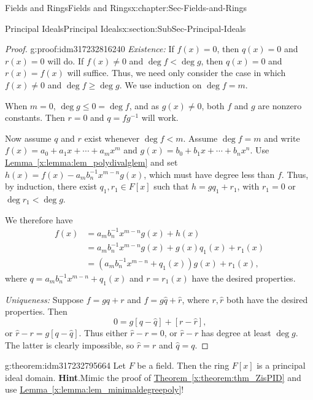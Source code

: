 \documentclass[oneside,10pt,]{book}
\newcommand{\blocktitlefont}{\relax}
\newcommand{\xreffont}{\relax}
\numberwithin{equation}{section}
\renewcommand{\le}{\leqslant}
\renewcommand{\ge}{\geqslant}
\newcommand{\lt}{<}
\newcommand{\amp}{&}
\begin{document}
\begin{chapterptx}{Fields and Rings}{}{Fields and Rings}{}{}{x:chapter:Sec-Fields-and-Rings}
\begin{sectionptx}{Principal Ideals}{}{Principal Ideals}{}{}{x:section:SubSec-Principal-Ideals}
\begin{proof}{}{g:proof:idm317232816240}
\emph{Existence:} If \(f(x) = 0\), then \(q(x) = 0\) and \(r(x) = 0\) will do. If \(f(x)\ne 0\) and \(\deg f \lt \deg g\), then \(q(x) = 0\) and \(r(x) = f(x)\) will suffice. Thus, we need only consider the case in which \(f(x) \ne 0\) and \(\deg f \ge \deg g\). We use induction on \(\deg f = m\).%
\par
When \(m = 0\), \(\deg g \le 0 = \deg f\), and as \(g(x) \ne 0\), both \(f\) and \(g\) are nonzero constants. Then \(r = 0\) and \(q = fg^{-1}\) will work.%
\par
Now assume \(q\) and \(r\) exist whenever \(\deg f \lt m\). Assume \(\deg f = m\) and write \(f(x) = a_0 + a_1 x + \cdots + a_m x^m\) and \(g(x) = b_0 + b_1 x + \cdots + b_n x^n\). Use \hyperref[x:lemma:lem_polydivalglem]{Lemma~{\xreffont\ref{x:lemma:lem_polydivalglem}}} and set \(h(x) = f(x) - a_m b_n^{-1} x^{m-n} g(x)\), which must have degree less than \(f\). Thus, by induction, there exist \(q_1, r_1\in F[x]\) such that \(h = g q_1 + r_1\), with \(r_1 = 0\) or \(\deg r_1 \lt \deg g\).%
\par
We therefore have%
\begin{align*}
f(x) \amp = a_m b_n^{-1} x^{m-n} g(x) + h(x)\\
\amp = a_m b_n^{-1} x^{m-n} g(x) + g(x) q_1(x) + r_1(x)\\
\amp = (a_m b_n^{-1} x^{m-n} + q_1(x)) g(x) + r_1(x)\text{,}
\end{align*}
where \(q = a_m b_n^{-1} x^{m-n} + q_1(x)\) and \(r = r_1(x)\) have the desired properties.%
\par
\emph{Uniqueness:} Suppose \(f = gq + r\) and \(f = g\hat{q} + \hat{r}\), where \(r,\hat{r}\) both have the desired properties. Then%
\begin{equation*}
0 = g[q - \hat{q}] + [r - \hat{r}]\text{,}
\end{equation*}
or \(\hat{r} - r = g [q - \hat{q}]\). Thus either \(\hat{r} - r = 0\), or \(\hat{r} - r\) has degree at least \(\deg g\). The latter is clearly impossible, so \(\hat{r} = r\) and \(\hat{q} = q\).%
\end{proof}
\begin{theorem}{}{}{g:theorem:idm317232795664}%
Let \(F\) be a field. Then the ring \(F[x]\) is a principal ideal domain.%
\textbf{\blocktitlefont Hint}.\quad{}Mimic the proof of \hyperref[x:theorem:thm_ZisPID]{Theorem~{\xreffont\ref{x:theorem:thm_ZisPID}}} and use \hyperref[x:lemma:lem_minimaldegreepoly]{Lemma~{\xreffont\ref{x:lemma:lem_minimaldegreepoly}}}!%

\end{theorem}
\end{sectionptx}
\end{chapterptx}
\end{document}
